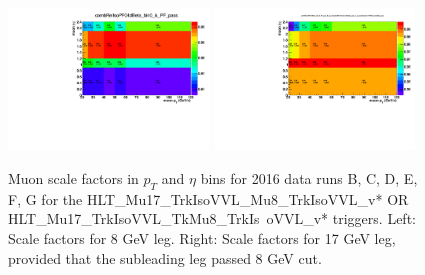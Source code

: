 \begin{figure}
\centering
\includegraphics[width=0.475\textwidth]{figures/trigger/Run_BCDEFG_PlotSF_hlt_Mu17_Mu8_OR_TkMu8_leg8_NUM_hlt_Mu17_Mu8_OR_TkMu8_leg8_DEN_LooseIDnISO_PAR_pt_eta_pt_abseta_ratio.pdf}
\includegraphics[width=0.475\textwidth]{figures/trigger/Run_BCDEFG_PlotSF_hlt_Mu17Mu8_leg17_NUM_hlt_Mu17Mu8_leg17_DEN_LooseIDnISO_PAR_pt_eta_pt_abseta_ratio.pdf}\\
\caption{Muon scale factors in $p_{T}$ and $\eta$ bins for 2016 data runs B, C, D, E, F, G for the  HLT\_Mu17\_TrkIsoVVL\_Mu8\_TrkIsoVVL\_v* OR HLT\_Mu17\_TrkIsoVVL\_TkMu8\_TrkIs\
oVVL\_v* triggers. Left: Scale factors for 8 GeV leg. Right: Scale factors for 17 GeV leg, provided that the subleading leg passed 8 GeV cut.}
\label{fig:trigger_SF_dimu_BCDEFG}
\end{figure}

